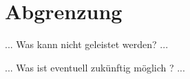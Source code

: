 \section{Abgrenzung}

... Was kann nicht geleistet werden? ...

... Was ist eventuell zukünftig möglich ? ...